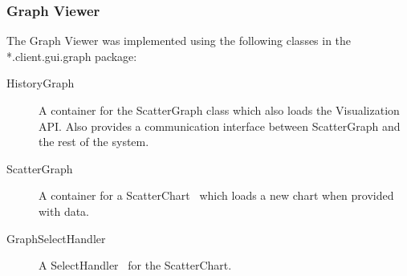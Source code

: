 \subsubsection{Graph Viewer}
The Graph Viewer was implemented using the following classes in the *.client.gui.graph package:
\begin{description}
\item[HistoryGraph] A container for the ScatterGraph class which also loads the Visualization API. Also provides a communication interface between ScatterGraph and the rest of the system.
\item[ScatterGraph] A container for a ScatterChart~\cite{scatter} which loads a new chart when provided with data.
\item[GraphSelectHandler]A SelectHandler~\cite{select} for the ScatterChart.
\end{description}
